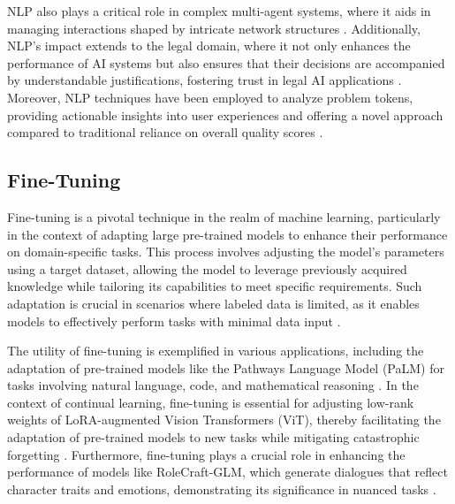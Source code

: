 NLP also plays a critical role in complex multi-agent systems, where it aids in managing interactions shaped by intricate network structures \cite{chen2024adaptivenetworkinterventioncomplex}. Additionally, NLP's impact extends to the legal domain, where it not only enhances the performance of AI systems but also ensures that their decisions are accompanied by understandable justifications, fostering trust in legal AI applications \cite{lin2023interpretabilityframeworksimilarcase}. Moreover, NLP techniques have been employed to analyze problem tokens, providing actionable insights into user experiences and offering a novel approach compared to traditional reliance on overall quality scores \cite{gupchup2018analysisproblemtokensrank}.





\subsection{Fine-Tuning} \label{subsec:Fine-Tuning}



Fine-tuning is a pivotal technique in the realm of machine learning, particularly in the context of adapting large pre-trained models to enhance their performance on domain-specific tasks. This process involves adjusting the model's parameters using a target dataset, allowing the model to leverage previously acquired knowledge while tailoring its capabilities to meet specific requirements. Such adaptation is crucial in scenarios where labeled data is limited, as it enables models to effectively perform tasks with minimal data input \cite{ginzburg2021selfsuperviseddocumentsimilarityranking}. 



The utility of fine-tuning is exemplified in various applications, including the adaptation of pre-trained models like the Pathways Language Model (PaLM) for tasks involving natural language, code, and mathematical reasoning \cite{chowdhery2023palm}. In the context of continual learning, fine-tuning is essential for adjusting low-rank weights of LoRA-augmented Vision Transformers (ViT), thereby facilitating the adaptation of pre-trained models to new tasks while mitigating catastrophic forgetting \cite{chitale2023taskarithmeticloracontinual}. Furthermore, fine-tuning plays a crucial role in enhancing the performance of models like RoleCraft-GLM, which generate dialogues that reflect character traits and emotions, demonstrating its significance in nuanced tasks \cite{tao2024rolecraftglmadvancingpersonalizedroleplaying}.



